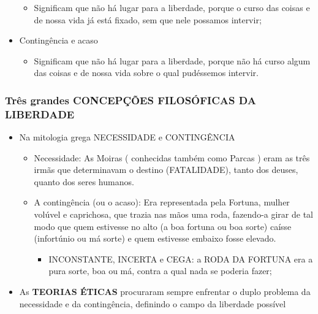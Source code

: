 \documentclass[
]{book}
\providecommand{\tightlist}{%
  \setlength{\itemsep}{0pt}\setlength{\parskip}{0pt}}
\begin{document}
\begin{itemize}
  \begin{itemize}
  \tightlist
  \item
    Significam que não há lugar para a liberdade, porque o curso das
    coisas e de nossa vida já está fixado, sem que nele possamos
    intervir;
  \end{itemize}
\item
  Contingência e acaso

  \begin{itemize}
  \tightlist
  \item
    Significam que não há lugar para a liberdade, porque não há curso
    algum das coisas e de nossa vida sobre o qual pudéssemos intervir.
  \end{itemize}
\end{itemize}

\hypertarget{truxeas-grandes-concepuxe7uxf5es-filosuxf3ficas-da-liberdade}{%
\subsubsection{Três grandes CONCEPÇÕES FILOSÓFICAS DA
LIBERDADE}\label{truxeas-grandes-concepuxe7uxf5es-filosuxf3ficas-da-liberdade}}

\begin{itemize}
\tightlist
\item
  Na mitologia grega NECESSIDADE e CONTINGÊNCIA

  \begin{itemize}
  \tightlist
  \item
    Necessidade: As Moiras ( conhecidas também como Parcas ) eram as
    três irmãs que determinavam o destino (FATALIDADE), tanto dos
    deuses, quanto dos seres humanos.
  \item
    A contingência (ou o acaso): Era representada pela Fortuna, mulher
    volúvel e caprichosa, que trazia nas mãos uma roda, fazendo-a girar
    de tal modo que quem estivesse no alto (a boa fortuna ou boa sorte)
    caísse (infortúnio ou má sorte) e quem estivesse embaixo fosse
    elevado.

    \begin{itemize}
    \tightlist
    \item
      INCONSTANTE, INCERTA e CEGA: a RODA DA FORTUNA era a pura sorte,
      boa ou má, contra a qual nada se poderia fazer;
    \end{itemize}
  \end{itemize}
\item
  As \textbf{TEORIAS ÉTICAS} procuraram sempre enfrentar o duplo
  problema da necessidade e da contingência, definindo o campo da
  liberdade possível
\end{itemize}
\end{document}
